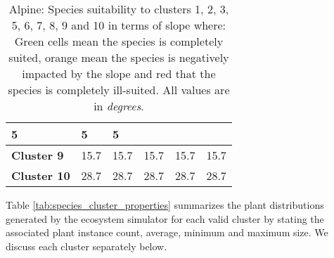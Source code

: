 \begin{table}[h]
\begin{tabular}{|p{2cm}|p{2.5cm}|p{2.5cm}|p{2.5cm}|p{2.5cm}|p{2.5cm}|}
		\cellcolor{color_green}5 & 
		\cellcolor{color_green}5 & 
		\cellcolor{color_green}5\\
		\hline
		\textbf{Cluster 9} & 
		\cellcolor{color_green}15.7 & 
		\cellcolor{color_orange}15.7 & 
		\cellcolor{color_green}15.7 & 
		\cellcolor{color_green}15.7 & 
		\cellcolor{color_orange}15.7\\
		\hline
		\textbf{Cluster 10} & 
		\cellcolor{color_orange}28.7 & 
		\cellcolor{color_orange}28.7 & 
		\cellcolor{color_green}28.7 & 
		\cellcolor{color_green}28.7 & 
		\cellcolor{color_orange}28.7\\
		\hline
		\end{tabular}
		\caption{Alpine: Species suitability to clusters 1, 2, 3, 5, 6, 7, 8, 9 and 10 in terms of slope where: Green cells mean the species is completely suited, orange mean the species is negatively impacted by the slope and red that the species is completely ill-suited. All values are in \textit{degrees}.}
	  \label{tab:results_alpine_species_slope_suitability}
\end{table}

Table \ref{tab:species_cluster_properties} summarizes the plant distributions generated by the ecosystem simulator for each valid cluster by stating the associated plant instance count, average, minimum and maximum size. We discuss each cluster separately below. \\

